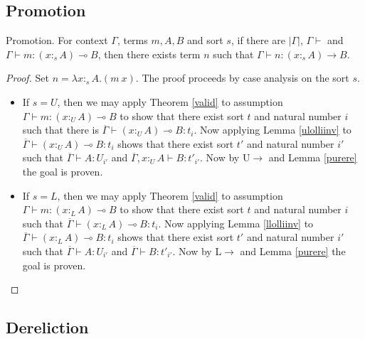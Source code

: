 \documentclass[sigplan,screen,review,anonymous]{acmart}
\newcommand{\rname}[1]{\textsc{\footnotesize #1}}
\newcommand{\pure}[1]{|#1|}
\newcommand{\utype}{:_{\scriptscriptstyle U}}
\newcommand{\ltype}{:_{\scriptscriptstyle L}}
\newcommand{\stype}[1]{:_#1}
\begin{document}
\subsection{Promotion}
\begin{theorem}\label{promotion}
  Promotion. For context $\Gamma$, terms $m, A, B$ and sort $s$, if there are $\pure{\Gamma}$, $\Gamma \vdash$ and $\Gamma \vdash m : (x \stype{s} A) \multimap B$, then there exists term $n$ such that $\Gamma \vdash n : (x \stype{s} A) \rightarrow B$.
\end{theorem}
\begin{proof}
  Set $n = \lambda x \stype{s} A. (m\ x)$. The proof proceeds by case analysis on the sort $s$.
  \begin{itemize}
    \item If $s = U$, then we may apply Theorem \ref{valid} to assumption $\Gamma \vdash m : (x \utype A) \multimap B$ to show that there exist sort $t$ and natural number $i$ such that there is $\overline{\Gamma} \vdash (x \utype A) \multimap B : t_i$. Now applying Lemma \ref{ulolliinv} to $\overline{\Gamma} \vdash (x \utype A) \multimap B : t_i$ shows that there exist sort $t'$ and natural number $i'$ such that $\overline{\Gamma} \vdash A : U_{i'}$ and $\overline{\Gamma}, x \utype A \vdash B : t'_{i'}$. Now by \rname{U$\rightarrow$} and Lemma \ref{purere} the goal is proven.
    \item If $s = L$, then we may apply Theorem \ref{valid} to assumption $\Gamma \vdash m : (x \ltype A) \multimap B$ to show that there exist sort $t$ and natural number $i$ such that $\overline{\Gamma} \vdash (x \ltype A) \multimap B : t_i$. Now applying Lemma \ref{llolliinv} to $\overline{\Gamma} \vdash (x \ltype A) \multimap B : t_i$ shows that there exist sort $t'$ and natural number $i'$ such that $\overline{\Gamma} \vdash A : U_{i'}$ and $\overline{\Gamma} \vdash B : t'_{i'}$. Now by \rname{L$\rightarrow$} and Lemma \ref{purere} the goal is proven.
  \end{itemize}
\end{proof}

\subsection{Dereliction}
\end{document}
